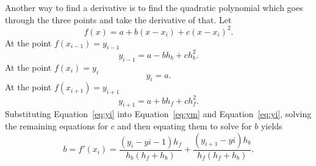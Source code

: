 \documentclass{scrartcl}
\begin{document}
Another way to find a derivative is to find the quadratic polynomial
which goes through the three points and take the derivative of that.
Let
\begin{equation}
f(x)=a+b(x-x_i)+c(x-x_i)^2.
\end{equation}
At the point $f(x_{i-1}) = y_{i-1}$
\begin{equation}
y_{i-1} = a-bh_b+ch_b^2.\label{eq:ym}
\end{equation}
At the point $f(x_i)= y_i$
\begin{equation}
y_i = a. \label{eq:yi}
\end{equation}
At the point $f(x_{i+1}) = y_{i+1}$
\begin{equation}
y_{i+1} = a+bh_f+ch_f^2.\label{eq:yp}
\end{equation}
Substituting Equation~\ref{eq:yi} into Equation~\ref{eq:ym}
and Equation~\ref{eq:yi}, solving the remaining equations for $c$
and then equating them to solve for $b$ yields
\begin{equation}
b = f'(x_i) = \frac{(y_i-y{i-1})h_f}{h_b(h_f+h_b)}+
	\frac{(y_{i+1}-y{i})h_b}{h_f(h_f+h_b)}.
\end{equation}

\appendix
\end{document}
